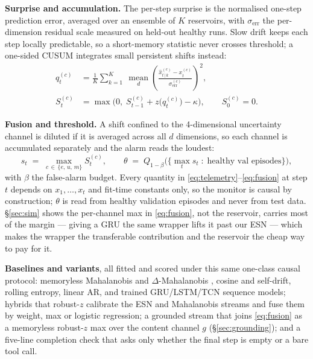 \documentclass{article}
\begin{document}
\textbf{Surprise and accumulation.} The per-step surprise is the normalised
one-step prediction error, averaged over an ensemble of $K$ reservoirs, with
$\sigma_{\mathrm{err}}$ the per-dimension residual scale measured on held-out
healthy runs. Slow drift keeps each step locally predictable, so a
short-memory statistic never crosses threshold; a one-sided CUSUM
\cite{page1954cusum} integrates small persistent shifts instead:
%
\begin{align}
q^{(c)}_t &= \frac{1}{K}\sum_{k=1}^{K}\ \operatorname*{mean}_{d}
  \left(\frac{\hat{x}^{(c)}_{t\,|\,k} - x^{(c)}_t}{\sigma^{(c)}_{\mathrm{err}}}\right)^{2}, \label{eq:surprise}\\
S^{(c)}_t &= \max\!\big(0,\; S^{(c)}_{t-1} + z\big(q^{(c)}_t\big) - \kappa\big),
  \qquad S^{(c)}_0 = 0. \label{eq:cusum}
\end{align}

\textbf{Fusion and threshold.} A shift confined to the 4-dimensional
uncertainty channel is diluted if it is averaged across all $d$ dimensions, so
each channel is accumulated separately and the alarm reads the loudest:
%
\begin{equation}
s_t \;=\; \max_{c \,\in\, \{e,\,u,\,m\}} S^{(c)}_t,
\qquad
\theta \;=\; Q_{1-\beta}\Big(\big\{\textstyle\max_t s_t \;:\; \text{healthy val episodes}\big\}\Big),
\label{eq:fusion}
\end{equation}
%
with $\beta$ the false-alarm budget. Every quantity in
\eqref{eq:telemetry}--\eqref{eq:fusion} at step $t$ depends on $x_1,\dots,x_t$
and fit-time constants only, so the monitor is causal by construction; $\theta$
is read from healthy validation episodes and never from test data. \S\ref{sec:sim}
shows the per-channel max in \eqref{eq:fusion}, not the reservoir, carries most
of the margin --- giving a GRU the same wrapper lifts it past our ESN --- which
makes the wrapper the transferable contribution and the reservoir the cheap way
to pay for it.

\textbf{Baselines and variants}, all fitted and scored under this same one-class
causal protocol: memoryless Mahalanobis and $\Delta$-Mahalanobis
\cite{lee2018simple}, cosine and self-drift, rolling entropy, linear AR, and
trained GRU/LSTM/TCN sequence models; hybrids that robust-$z$ calibrate the ESN
and Mahalanobis streams and fuse them by weight, max or logistic regression; a
grounded stream that joins \eqref{eq:fusion} as a memoryless robust-$z$ max over
the content channel $g$ (\S\ref{sec:grounding}); and a five-line completion check
that asks only whether the final step is empty or a bare tool call.
\end{document}
